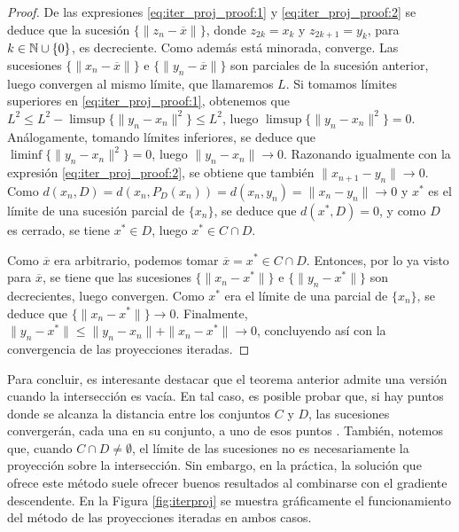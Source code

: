 \begin{proof}
    De las expresiones \ref{eq:iter_proj_proof:1} y \ref{eq:iter_proj_proof:2} se deduce que la sucesión $\{\|z_n - \overline{x}\|\}$, donde $z_{2k} = x_k$ y $z_{2k+1} = y_k$, para $k \in \mathbb{N} \cup\{0\}$, es decreciente. Como además está minorada, converge. Las sucesiones $\{\|x_n - \overline{x}\|\}$ e $\{\|y_n - \overline{x}\|\}$ son parciales de la sucesión anterior, luego convergen al mismo límite, que llamaremos $L$. Si tomamos límites superiores en \ref{eq:iter_proj_proof:1}, obtenemos que $L^2 \le L^2 - \limsup\{\|y_n - x_n\|^2\} \le L^2$, luego $\limsup\{\|y_n - x_n\|^2\} = 0$. Análogamente, tomando límites inferiores, se deduce que $\liminf\{\|y_n - x_n\|^2\} = 0$, luego $\|y_n - x_n \| \to 0$. Razonando igualmente con la expresión \ref{eq:iter_proj_proof:2}, se obtiene que también $\|x_{n+1} - y_n\| \to 0$. Como $d(x_n,D) = d(x_n,P_D(x_n)) = d(x_n,y_n) = \|x_n - y_n \| \to 0$ y $x^*$ es el límite de una sucesión parcial de $\{x_n\}$, se deduce que $d(x^*,D) = 0$, y como $D$ es cerrado, se tiene $x^* \in D$, luego $x^* \in C\cap D$.

    Como $\overline{x}$ era arbitrario, podemos tomar $\overline{x} = x^* \in C\cap D$. Entonces, por lo ya visto para $\overline{x}$, se tiene que las sucesiones $\{\|x_n - x^*\|\}$ e $\{\|y_n - x^*\|\}$ son decrecientes, luego convergen. Como $x^*$ era el límite de una parcial de $\{x_n\}$, se deduce que $\{\|x_n - x^*\|\} \to 0$. Finalmente, $\|y_n - x^*\| \le \|y_n - x_n\| + \|x_n - x^*\| \to 0$, concluyendo así con la convergencia de las proyecciones iteradas.

\end{proof}

Para concluir, es interesante destacar que el teorema anterior admite una versión cuando la intersección es vacía. En tal caso, es posible probar que, si hay puntos donde se alcanza la distancia entre los conjuntos $C$ y $D$, las sucesiones convergerán, cada una en su conjunto, a uno de esos puntos \cite{proximity_convex}. También, notemos que, cuando $C \cap D \ne \emptyset$, el límite de las sucesiones no es necesariamente la proyección sobre la intersección. Sin embargo, en la práctica, la solución que ofrece este método suele ofrecer buenos resultados al combinarse con el gradiente descendente. En la Figura \ref{fig:iterproj} se muestra gráficamente el funcionamiento del método de las proyecciones iteradas en ambos casos.

